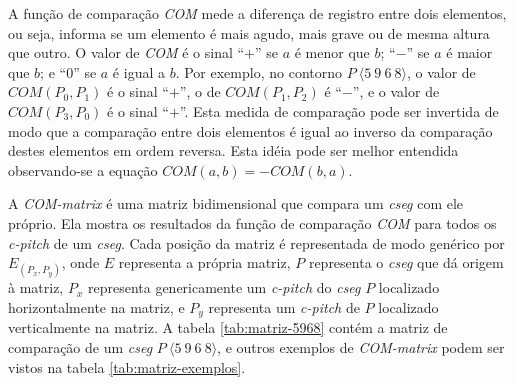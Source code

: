 \documentclass[brazil]{article}
\newcommand{\termo}[1]{\textit{#1}}
\begin{document}
A função de comparação \termo{COM} mede a diferença de registro entre
dois elementos, ou seja, informa se um elemento é mais agudo, mais
grave ou de mesma altura que outro. O valor de \termo{COM} é o sinal
``$+$'' se $a$ é menor que $b$; ``$-$'' se $a$ é maior que $b$; e
``$0$'' se $a$ é igual a $b$. Por exemplo, no contorno
$P\:\langle5\:9\:6\:8\rangle$, o valor de $COM(P_0,P_1)$ é o sinal
``$+$'', o de $COM(P_1,P_2)$ é ``$-$'', e o valor de $COM(P_3,P_0)$ é
o sinal ``$+$''. Esta medida de comparação pode ser invertida de modo
que a comparação entre dois elementos é igual ao inverso da comparação
destes elementos em ordem reversa. Esta idéia pode ser melhor
entendida observando-se a equação $COM(a,b)=-COM(b,a)$.

A \termo{COM-matrix} é uma matriz bidimensional que compara um
\termo{cseg} com ele próprio. Ela mostra os resultados da função de
comparação \termo{COM} para todos os \termo{c-pitch} de um
\termo{cseg}. Cada posição da matriz é representada de modo genérico
por $E_(P_x,P_y)$, onde $E$ representa a própria matriz, $P$
representa o \termo{cseg} que dá origem à matriz, $P_x$ representa
genericamente um \termo{c-pitch} do \termo{cseg} $P$ localizado
horizontalmente na matriz, e $P_y$ representa um \termo{c-pitch} de
$P$ localizado verticalmente na matriz. A tabela \ref{tab:matriz-5968}
contém a matriz de comparação de um \termo{cseg}
$P\:\langle5\:9\:6\:8\rangle$, e outros exemplos de \termo{COM-matrix}
podem ser vistos na tabela \ref{tab:matriz-exemplos}.
\end{document}
